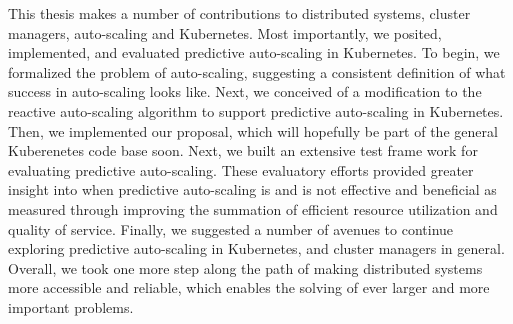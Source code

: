 This thesis makes a number of contributions to distributed systems, cluster
managers, auto-scaling and Kubernetes. Most importantly, we posited,
implemented, and evaluated predictive auto-scaling in Kubernetes. To begin, we
formalized the problem of auto-scaling, suggesting a consistent definition of
what success in auto-scaling looks like. Next, we conceived of a
modification to the reactive auto-scaling
algorithm to support predictive auto-scaling in Kubernetes. Then, we implemented
our proposal, which will hopefully be part of the general Kuberenetes code base
soon. Next, we built an extensive test frame work for evaluating predictive
auto-scaling. These evaluatory efforts provided greater insight into
when predictive auto-scaling is and is not
effective and beneficial as measured through improving the summation of
efficient resource utilization and quality of service.
Finally, we suggested a number of avenues to
continue exploring predictive auto-scaling in Kubernetes, and cluster managers
in general. Overall, we took one more step along the path of making distributed
systems more accessible and reliable, which enables the solving of ever larger
and more important problems.
